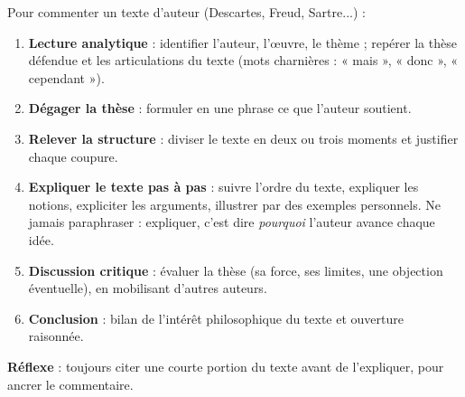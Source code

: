 \documentclass[11pt]{article}
\begin{document}
\begin{methode}
Pour commenter un texte d'auteur (Descartes, Freud, Sartre...) :
\begin{enumerate}
\item \textbf{Lecture analytique} : identifier l'auteur, l'œuvre, le thème ; repérer la thèse défendue et les articulations du texte (mots charnières : « mais », « donc », « cependant »).
\item \textbf{Dégager la thèse} : formuler en une phrase ce que l'auteur soutient.
\item \textbf{Relever la structure} : diviser le texte en deux ou trois moments et justifier chaque coupure.
\item \textbf{Expliquer le texte pas à pas} : suivre l'ordre du texte, expliquer les notions, expliciter les arguments, illustrer par des exemples personnels. Ne jamais paraphraser : expliquer, c'est dire \emph{pourquoi} l'auteur avance chaque idée.
\item \textbf{Discussion critique} : évaluer la thèse (sa force, ses limites, une objection éventuelle), en mobilisant d'autres auteurs.
\item \textbf{Conclusion} : bilan de l'intérêt philosophique du texte et ouverture raisonnée.
\end{enumerate}
\textbf{Réflexe} : toujours citer une courte portion du texte avant de l'expliquer, pour ancrer le commentaire.
\end{methode}
\end{document}
